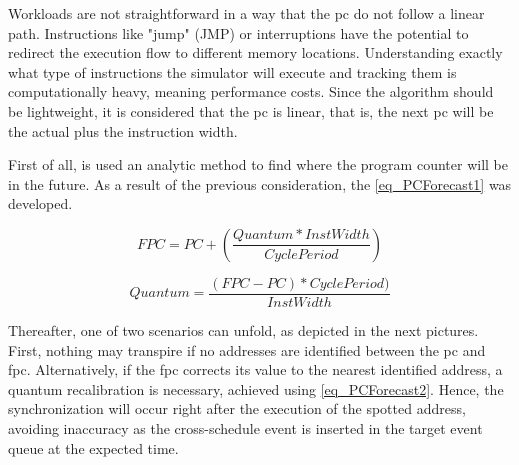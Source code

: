 Workloads are not straightforward in a way that the \gls{pc} do not follow a linear path. Instructions like "jump" (JMP) or interruptions 
have the potential to redirect the execution flow to different memory locations. Understanding exactly what type of instructions the simulator 
will execute and tracking them is computationally heavy, meaning performance costs. Since the algorithm should be lightweight, it is considered 
that the \gls{pc} is linear, that is, the next \gls{pc} will be the actual plus the instruction width. 

First of all, is used an analytic method to find where the program counter will be in the future. As a result of the previous consideration, 
the \autoref{eq_PCForecast1} was developed.

\begin{equation}
    FPC = PC + \left( \frac{Quantum * InstWidth}{CyclePeriod} \right)
    \label{eq_PCForecast1}
\end{equation}

\begin{equation}
    Quantum = \frac{  \left( FPC - PC \right) * CyclePeriod)}{InstWidth} 
    \label{eq_PCForecast2}
\end{equation}

\hspace*{1cm}

Thereafter, one of two scenarios can unfold, as depicted in the next pictures. First, nothing may transpire if no addresses are 
identified between the \gls{pc} and \gls{fpc}. Alternatively, if the \gls{fpc} corrects its value to the nearest identified 
address, a quantum recalibration is necessary, achieved using \autoref{eq_PCForecast2}. Hence, the synchronization will occur right after the 
execution of the spotted address, avoiding inaccuracy as the cross-schedule event is inserted in the target event queue at the expected time.


